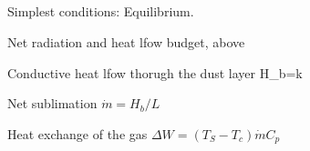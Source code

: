 \documentclass{article}
\begin{document}
\subsection{} %
Simplest conditions: 
\qi Equilibrium.

Net radiation and heat lfow budget, above

Conductive heat lfow thorugh the dust layer
\qbn H_b=k \qen

Net sublimation  $ \dot{m} = H_b/L$

Heat exchange of the gas $\Delta W = \left( T_S-T_c \right) \dot{m} C_p $
\end{document}
